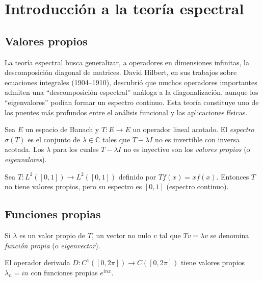 \chapter{Introducción a la teoría espectral}
\label{ch:teoria-espectral}

\section{Valores propios}

La teoría espectral busca generalizar, a operadores en dimensiones infinitas, la descomposición diagonal de matrices. David Hilbert, en sus trabajos sobre ecuaciones integrales (1904--1910), descubrió que muchos operadores importantes admiten una ``descomposición espectral'' análoga a la diagonalización, aunque los ``eigenvalores'' podían formar un espectro continuo. Esta teoría constituye uno de los puentes más profundos entre el análisis funcional y las aplicaciones físicas.

\begin{definition}
\label{def:espectro}
Sea $E$ un espacio de Banach y $T\colon E\to E$ un operador lineal acotado. El \emph{espectro} $\sigma(T)$ es el conjunto de $\lambda\in\mathbb{C}$ tales que $T-\lambda I$ no es invertible con inversa acotada. Los $\lambda$ para los cuales $T-\lambda I$ no es inyectivo son los \emph{valores propios} (o \emph{eigenvalores}).
\end{definition}

\begin{example}
\label{ej:multiplicacion}
Sea $T\colon L^2([0,1])\to L^2([0,1])$ definido por $Tf(x)=xf(x)$. Entonces $T$ no tiene valores propios, pero su espectro es $[0,1]$ (espectro continuo).
\end{example}

\section{Funciones propias}

\begin{definition}
\label{def:funcion-propia}
Si $\lambda$ es un valor propio de $T$, un vector no nulo $v$ tal que $Tv=\lambda v$ se denomina \emph{función propia} (o \emph{eigenvector}).
\end{definition}

\begin{example}
\label{ej:derivada}
El operador derivada $D\colon C^1([0,2\pi])\to C([0,2\pi])$ tiene valores propios $\lambda_n=in$ con funciones propias $e^{inx}$.
\end{example}

